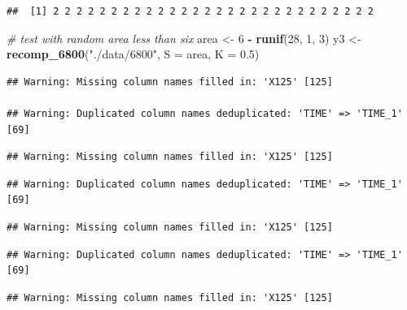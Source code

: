 \documentclass[
]{krantz}
\makeatletter
\newenvironment{Shaded}{\begin{snugshade}}{\end{snugshade}}
\newcommand{\CommentTok}[1]{\textcolor[rgb]{0.56,0.35,0.01}{\textit{#1}}}
\newcommand{\DataTypeTok}[1]{\textcolor[rgb]{0.13,0.29,0.53}{#1}}
\newcommand{\DecValTok}[1]{\textcolor[rgb]{0.00,0.00,0.81}{#1}}
\newcommand{\FloatTok}[1]{\textcolor[rgb]{0.00,0.00,0.81}{#1}}
\newcommand{\KeywordTok}[1]{\textcolor[rgb]{0.13,0.29,0.53}{\textbf{#1}}}
\newcommand{\NormalTok}[1]{#1}
\newcommand{\OperatorTok}[1]{\textcolor[rgb]{0.81,0.36,0.00}{\textbf{#1}}}
\newcommand{\StringTok}[1]{\textcolor[rgb]{0.31,0.60,0.02}{#1}}
\newenvironment{kframe}{%
\medskip{}
\setlength{\fboxsep}{.8em}
 \def\at@end@of@kframe{}%
 \ifinner\ifhmode%
  \def\at@end@of@kframe{\end{minipage}}%
  \begin{minipage}{\columnwidth}%
 \fi\fi%
 \def\FrameCommand##1{\hskip\@totalleftmargin \hskip-\fboxsep
 \colorbox{shadecolor}{##1}\hskip-\fboxsep
     \hskip-\linewidth \hskip-\@totalleftmargin \hskip\columnwidth}%
 \MakeFramed {\advance\hsize-\width
   \@totalleftmargin\z@ \linewidth\hsize
   \@setminipage}}%
 {\par\unskip\endMakeFramed%
 \at@end@of@kframe}
\renewenvironment{Shaded}{\begin{kframe}}{\end{kframe}}
\makeatother
\begin{document}
\begin{Shaded}
\end{Shaded}

\begin{verbatim}
##  [1] 2 2 2 2 2 2 2 2 2 2 2 2 2 2 2 2 2 2 2 2 2 2 2 2 2 2 2 2
\end{verbatim}

\begin{Shaded}
\begin{Highlighting}[]
\CommentTok{# test with random area less than six}
\NormalTok{area <-}\StringTok{ }\DecValTok{6} \OperatorTok{-}\StringTok{ }\KeywordTok{runif}\NormalTok{(}\DecValTok{28}\NormalTok{, }\DecValTok{1}\NormalTok{, }\DecValTok{3}\NormalTok{)}
\NormalTok{y3 <-}\StringTok{ }\KeywordTok{recomp_6800}\NormalTok{(}\StringTok{"./data/6800"}\NormalTok{, }\DataTypeTok{S =}\NormalTok{ area, }\DataTypeTok{K =} \FloatTok{0.5}\NormalTok{)}
\end{Highlighting}
\end{Shaded}

\begin{verbatim}
## Warning: Missing column names filled in: 'X125' [125]

## Warning: Duplicated column names deduplicated: 'TIME' => 'TIME_1' [69]
\end{verbatim}

\begin{verbatim}
## Warning: Missing column names filled in: 'X125' [125]
\end{verbatim}

\begin{verbatim}
## Warning: Duplicated column names deduplicated: 'TIME' => 'TIME_1' [69]
\end{verbatim}

\begin{verbatim}
## Warning: Missing column names filled in: 'X125' [125]
\end{verbatim}

\begin{verbatim}
## Warning: Duplicated column names deduplicated: 'TIME' => 'TIME_1' [69]
\end{verbatim}

\begin{verbatim}
## Warning: Missing column names filled in: 'X125' [125]
\end{verbatim}
\end{document}

